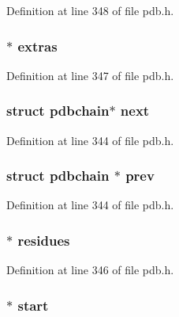 Definition at line 348 of file pdb.\-h.

\hypertarget{structpdbchain_aaa357dbbf4b88fcb1df71547b2d085a6}{
\subsubsection[{extras}]{$\ast$ extras}}\label{structpdbchain_aaa357dbbf4b88fcb1df71547b2d085a6}


Definition at line 347 of file pdb.\-h.

\hypertarget{structpdbchain_a2aede0a4c56d29f464f019d394e2a77e}{
\subsubsection[{next}]{\setlength{\rightskip}{0pt plus 5cm}struct {\bf pdbchain}$\ast$ next}}\label{structpdbchain_a2aede0a4c56d29f464f019d394e2a77e}


Definition at line 344 of file pdb.\-h.

\hypertarget{structpdbchain_a12f14cc2dfeccaa7c56d29b127d53240}{
\subsubsection[{prev}]{\setlength{\rightskip}{0pt plus 5cm}struct {\bf pdbchain} $\ast$ prev}}\label{structpdbchain_a12f14cc2dfeccaa7c56d29b127d53240}


Definition at line 344 of file pdb.\-h.

\hypertarget{structpdbchain_afd542e271e187b3bd714f15fb9644915}{
\subsubsection[{residues}]{$\ast$ residues}}\label{structpdbchain_afd542e271e187b3bd714f15fb9644915}


Definition at line 346 of file pdb.\-h.

\hypertarget{structpdbchain_af9637d86382b94dc2d5afbf24ecc4a34}{
\subsubsection[{start}]{$\ast$ start}}\label{structpdbchain_af9637d86382b94dc2d5afbf24ecc4a34}


